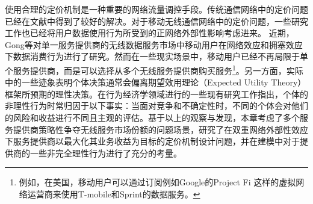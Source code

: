 使用合理的定价机制是一种重要的网络流量调控手段。传统通信网络中的定价问题已经在文献\cite{Walrand08,Huang10,Xinbin,CaoTVT,Xiaoming}中得到了较好的解决。对于移动无线通信网络中的定价问题，一些研究工作也已经将用户数据使用行为所受到的正网络外部性影响考虑进来\cite{Hartline08,Candogan12,SwapnaES12}。
近期，Gong等\cite{GongDCZ17}对单一服务提供商的无线数据服务市场中移动用户在网络效应和拥塞效应下数据消费行为进行了研究。然而在一些现实场景中，移动用户已经不再局限于单个服务提供商，而是可以选择从多个无线服务提供商购买服务\footnote{例如，在美国，移动用户可以通过订阅例如Google的Project Fi \cite{GoogleFi}这样的虚拟网络运营商来使用T-mobile和Sprint的数据服务。}。另一方面，实际中的一些迹象表明个体决策通常会偏离期望效用理论（Expected Utility Theory）框架\cite{Von}所预期的理性决策。在行为经济学领域进行的一些现有研究工作\cite{camerer2011behavioral}指出，个体的非理性行为时常归因于以下事实：当面对竞争和不确定性时，不同的个体会对他们的风险和收益进行不同且主观的评估。基于以上的观察与发现，本章考虑了多个服务提供商策略性争夺无线服务市场份额的问题场景，研究了在双重网络外部性效应下服务提供商以最大化其业务收益为目标的定价机制设计问题，并在建模中对于提供商的一些非完全理性行为进行了充分的考量。


